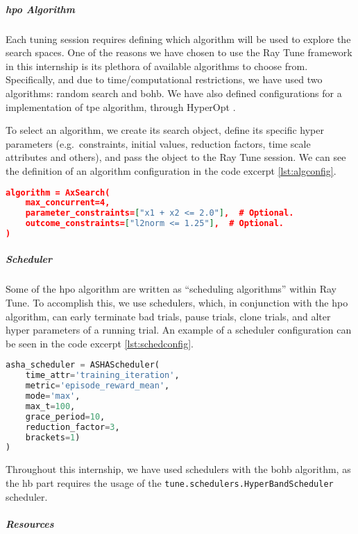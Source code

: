 \subparagraph{\acrshort{hpo} Algorithm}

Each tuning session requires defining which algorithm will be used to explore the search spaces. One of the reasons we have chosen to use the Ray Tune framework in this internship is its plethora of available algorithms to choose from. Specifically, and due to time/computational restrictions, we have used two algorithms: random search and \acrshort{bohb}. We have also defined configurations for a implementation of \acrshort{tpe} algorithm, through HyperOpt \parencite{10.5555/3042817.3042832}.

To select an algorithm, we create its search object, define its specific hyper parameters (e.g.\ constraints, initial values, reduction factors, time scale attributes and others), and pass the object to the Ray Tune session. We can see the definition of an algorithm configuration in the code excerpt \ref{lst:algconfig}.

\begin{lstlisting}[language=json, caption=Example algorithm configuration, captionpos=b, label={lst:algconfig}]
algorithm = AxSearch(
    max_concurrent=4,
    parameter_constraints=["x1 + x2 <= 2.0"],  # Optional.
    outcome_constraints=["l2norm <= 1.25"],  # Optional.
)
\end{lstlisting}

\subparagraph{Scheduler}

Some of the \acrshort{hpo} algorithm are written as ``scheduling algorithms'' within Ray Tune. To accomplish this, we use schedulers, which, in conjunction with the \acrshort{hpo} algorithm, can early terminate bad trials, pause trials, clone trials, and alter hyper parameters of a running trial. An example of a scheduler configuration can be seen in the code excerpt \ref{lst:schedconfig}.

\begin{lstlisting}[language=Python, caption=Example trial scheduler configuration, captionpos=b, label={lst:schedconfig}]
asha_scheduler = ASHAScheduler(
    time_attr='training_iteration',
    metric='episode_reward_mean',
    mode='max',
    max_t=100,
    grace_period=10,
    reduction_factor=3,
    brackets=1)
)
\end{lstlisting}

Throughout this internship, we have used schedulers with the \acrshort{bohb} algorithm, as the \acrshort{hb} part requires the usage of the \verb!tune.schedulers.HyperBandScheduler! scheduler.

\subparagraph{Resources}

